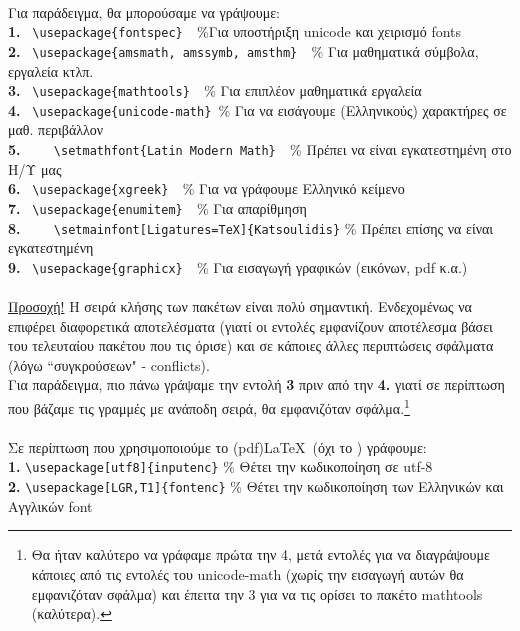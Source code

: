 \documentclass[a4paper, 12pt, oneside, xelatex, final]{article}
\begin{document}
	\\
	Για παράδειγμα, θα μπορούσαμε να γράψουμε:\\
	\textbf{1.} \verb+ \usepackage{fontspec}  +\%Για υποστήριξη unicode και χειρισμό fonts\\ 
	\textbf{2.} \verb+ \usepackage{amsmath, amssymb, amsthm}  +\% Για μαθηματικά σύμβολα, εργαλεία κτλπ.\\
	\textbf{3.} \verb+ \usepackage{mathtools}  +\% Για επιπλέον μαθηματικά εργαλεία\\
	\textbf{4.} \verb+ \usepackage{unicode-math} +\% Για να εισάγουμε (Ελληνικούς) χαρακτήρες σε μαθ. περιβάλλον\\
	\textbf{5.} \verb+    \setmathfont{Latin Modern Math}  +\% Πρέπει να είναι εγκατεστημένη στο Η/Υ μας \footnotemark[1]\\
	\textbf{6.} \verb+ \usepackage{xgreek}  +\% Για να γράφουμε Ελληνικό κείμενο\\
	\textbf{7.} \verb+ \usepackage{enumitem}  +\% Για απαρίθμηση\\
	\textbf{8.} \verb+    \setmainfont[Ligatures=TeX]{Katsoulidis}+ \% Πρέπει επίσης να είναι εγκατεστημένη \footnotemark[1] \\
	\textbf{9.} \verb+ \usepackage{graphicx}  +\% Για εισαγωγή γραφικών (εικόνων, pdf κ.α.) \\ \\
	\underline{Προσοχή!} Η σειρά κλήσης των πακέτων είναι πολύ σημαντική. Ενδεχομένως να επιφέρει διαφορετικά αποτελέσματα (γιατί οι εντολές εμφανίζουν αποτέλεσμα βάσει του τελευταίου πακέτου που τις όρισε) και σε κάποιες άλλες περιπτώσεις σφάλματα (λόγω ``συγκρούσεων" - conflicts).\\
	Για παράδειγμα, πιο πάνω γράψαμε την εντολή \textbf{3} πριν από την \textbf{4.} γιατί σε περίπτωση που βάζαμε τις γραμμές με ανάποδη σειρά, θα εμφανιζόταν σφάλμα.\footnote{Θα ήταν καλύτερο να γράφαμε πρώτα την 4, μετά εντολές για να διαγράψουμε κάποιες από τις εντολές του unicode-math (χωρίς την εισαγωγή αυτών θα εμφανιζόταν σφάλμα) και έπειτα την 3 για να τις ορίσει το πακέτο mathtools (καλύτερα).}\\  \\
	Σε περίπτωση που χρησιμοποιούμε το (pdf)\LaTeX\ (όχι το \XeLaTeX) γράφουμε:\\
	\textbf{1.} \verb+\usepackage[utf8]{inputenc}+  \% Θέτει την κωδικοποίηση σε utf-8\\
	\textbf{2.} \verb+\usepackage[LGR,T1]{fontenc}+ \% Θέτει την κωδικοποίηση των Ελληνικών και Αγγλικών font\\
\end{document}
